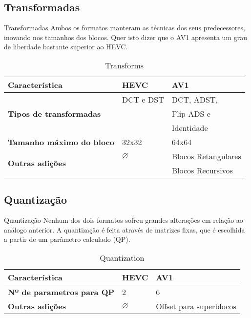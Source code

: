 \documentclass{beamer}
\begin{document}
\subsection{Transformadas}
\begin{frame}{Transformadas}
	Ambos os formatos manteram as técnicas dos seus predecessores, inovando nos tamanhos dos blocos. Quer isto dizer que o AV1 apresenta um grau de liberdade bastante superior ao HEVC.
	\begin{table}
		\centering
		\begin{tabular}{l|l|l}
			\textbf{Característica} 													& \textbf{HEVC} 	& \textbf{AV1} \\\hline
			\multirow{3}{*}{\textbf{Tipos de transformadas}} 	& DCT e DST 			& DCT, ADST, \\
			&									& Flip ADS e \\
			&									& Identidade \\
			\textbf{Tamanho máximo do bloco} 									& 32x32		 				& 64x64 \\
			\multirow{2}{*}{\textbf{Outras adições}}					& $\varnothing$		& Blocos Retangulares \\
			&									& Blocos Recursivos \\
		\end{tabular}
		\caption{\label{tab:transforms}Transforms}
	\end{table}
\end{frame}

\subsection{Quantização}
\begin{frame}{Quantização}
	Nenhum dos dois formatos sofreu grandes alterações em relação ao análogo anterior. A quantização é feita através de matrizes fixas, que é escolhida a partir de um parâmetro calculado (QP).
	\begin{table}
		\centering
		\begin{tabular}{l|l|l}
			\textbf{Característica} 													& \textbf{HEVC} 	& \textbf{AV1} \\\hline
			\textbf{Nº de parametros para QP}									& 2					 			& 6 \\
			\textbf{Outras adições}														& $\varnothing$		& Offset para superblocos \\
		\end{tabular}
		\caption{\label{tab:quantization}Quantization}
	\end{table}
\end{frame}
\end{document}
